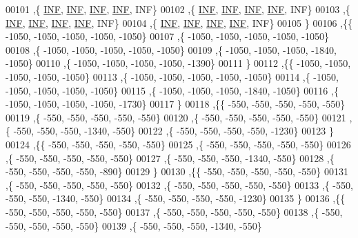 \begin{DoxyCode}
00101   ,\{   \hyperlink{constants_8h_a12c2040f25d8e3a7b9e1c2024c618cb6}{INF},   \hyperlink{constants_8h_a12c2040f25d8e3a7b9e1c2024c618cb6}{INF},   \hyperlink{constants_8h_a12c2040f25d8e3a7b9e1c2024c618cb6}{INF},   \hyperlink{constants_8h_a12c2040f25d8e3a7b9e1c2024c618cb6}{INF},   INF\}
00102   ,\{   \hyperlink{constants_8h_a12c2040f25d8e3a7b9e1c2024c618cb6}{INF},   \hyperlink{constants_8h_a12c2040f25d8e3a7b9e1c2024c618cb6}{INF},   \hyperlink{constants_8h_a12c2040f25d8e3a7b9e1c2024c618cb6}{INF},   \hyperlink{constants_8h_a12c2040f25d8e3a7b9e1c2024c618cb6}{INF},   INF\}
00103   ,\{   \hyperlink{constants_8h_a12c2040f25d8e3a7b9e1c2024c618cb6}{INF},   \hyperlink{constants_8h_a12c2040f25d8e3a7b9e1c2024c618cb6}{INF},   \hyperlink{constants_8h_a12c2040f25d8e3a7b9e1c2024c618cb6}{INF},   \hyperlink{constants_8h_a12c2040f25d8e3a7b9e1c2024c618cb6}{INF},   INF\}
00104   ,\{   \hyperlink{constants_8h_a12c2040f25d8e3a7b9e1c2024c618cb6}{INF},   \hyperlink{constants_8h_a12c2040f25d8e3a7b9e1c2024c618cb6}{INF},   \hyperlink{constants_8h_a12c2040f25d8e3a7b9e1c2024c618cb6}{INF},   \hyperlink{constants_8h_a12c2040f25d8e3a7b9e1c2024c618cb6}{INF},   INF\}
00105   \}
00106  ,\{\{ -1050, -1050, -1050, -1050, -1050\}
00107   ,\{ -1050, -1050, -1050, -1050, -1050\}
00108   ,\{ -1050, -1050, -1050, -1050, -1050\}
00109   ,\{ -1050, -1050, -1050, -1840, -1050\}
00110   ,\{ -1050, -1050, -1050, -1050, -1390\}
00111   \}
00112  ,\{\{ -1050, -1050, -1050, -1050, -1050\}
00113   ,\{ -1050, -1050, -1050, -1050, -1050\}
00114   ,\{ -1050, -1050, -1050, -1050, -1050\}
00115   ,\{ -1050, -1050, -1050, -1840, -1050\}
00116   ,\{ -1050, -1050, -1050, -1050, -1730\}
00117   \}
00118  ,\{\{  -550,  -550,  -550,  -550,  -550\}
00119   ,\{  -550,  -550,  -550,  -550,  -550\}
00120   ,\{  -550,  -550,  -550,  -550,  -550\}
00121   ,\{  -550,  -550,  -550, -1340,  -550\}
00122   ,\{  -550,  -550,  -550,  -550, -1230\}
00123   \}
00124  ,\{\{  -550,  -550,  -550,  -550,  -550\}
00125   ,\{  -550,  -550,  -550,  -550,  -550\}
00126   ,\{  -550,  -550,  -550,  -550,  -550\}
00127   ,\{  -550,  -550,  -550, -1340,  -550\}
00128   ,\{  -550,  -550,  -550,  -550,  -890\}
00129   \}
00130  ,\{\{  -550,  -550,  -550,  -550,  -550\}
00131   ,\{  -550,  -550,  -550,  -550,  -550\}
00132   ,\{  -550,  -550,  -550,  -550,  -550\}
00133   ,\{  -550,  -550,  -550, -1340,  -550\}
00134   ,\{  -550,  -550,  -550,  -550, -1230\}
00135   \}
00136  ,\{\{  -550,  -550,  -550,  -550,  -550\}
00137   ,\{  -550,  -550,  -550,  -550,  -550\}
00138   ,\{  -550,  -550,  -550,  -550,  -550\}
00139   ,\{  -550,  -550,  -550, -1340,  -550\}

\end{DoxyCode}
